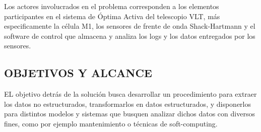 Los actores involucrados en el problema corresponden a los elementos participantes en el sistema de Óptima Activa del telescopio VLT, más especificamente la célula M1, los sensores de frente de onda Shack-Hartmann y el software de control que almacena y analiza los logs y los datos entregados por los sensores\cite{eso2011vlt}.

\subsection{OBJETIVOS Y ALCANCE}

EL objetivo detrás de la solución busca desarrollar un procedimiento para extraer los datos no estructurados, transformarlos en datos estructurados, y disponerlos para distintos modelos y sistemas
que busquen analizar dichos datos con diversos fines, como por ejemplo mantenimiento o técnicas de soft-computing.
